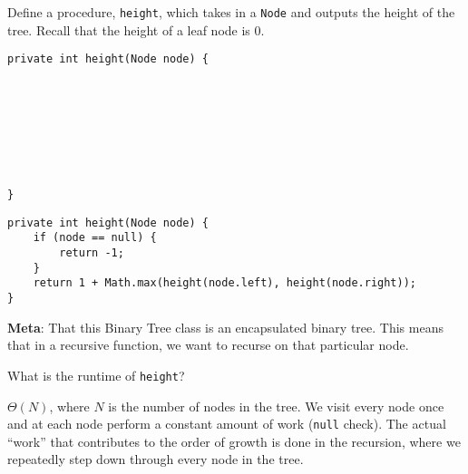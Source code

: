 \begin{blocksection}
\question Define a procedure, \lstinline$height$, which takes in a
\lstinline$Node$ and outputs the height of the tree. Recall that the height of
a leaf node is 0.

\ifprintanswers
\else
\begin{lstlisting}
private int height(Node node) {








}
\end{lstlisting}
\fi

\begin{solution}
\begin{lstlisting}
private int height(Node node) {
    if (node == null) {
        return -1;
    }
    return 1 + Math.max(height(node.left), height(node.right));
}
\end{lstlisting}

\textbf{Meta}: That this Binary Tree class is an encapsulated binary tree. This
means that in a recursive function, we want to recurse on that particular node.
\end{solution}

What is the runtime of \lstinline$height$?
\begin{solution}[0.25in]
$\Theta(N)$, where $N$ is the number of nodes in the tree. We visit every node
once and at each node perform a constant amount of work (\lstinline$null$
check). The actual ``work'' that contributes to the order of growth is done in
the recursion, where we repeatedly step down through every node in the tree.
\end{solution}
\end{blocksection}
